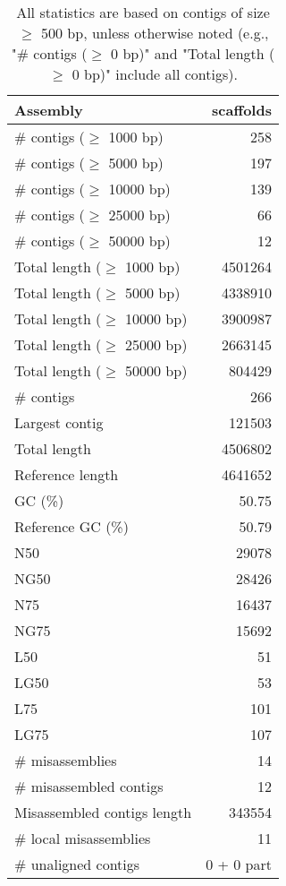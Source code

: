 \documentclass[12pt,a4paper]{article}
\begin{document}
\begin{table}[ht]
\begin{center}
\caption{All statistics are based on contigs of size $\geq$ 500 bp, unless otherwise noted (e.g., "\# contigs ($\geq$ 0 bp)" and "Total length ($\geq$ 0 bp)" include all contigs).}
\begin{tabular}{|l*{1}{|r}|}
\hline
Assembly & scaffolds \\ \hline
\# contigs ($\geq$ 1000 bp) & 258 \\ \hline
\# contigs ($\geq$ 5000 bp) & 197 \\ \hline
\# contigs ($\geq$ 10000 bp) & 139 \\ \hline
\# contigs ($\geq$ 25000 bp) & 66 \\ \hline
\# contigs ($\geq$ 50000 bp) & 12 \\ \hline
Total length ($\geq$ 1000 bp) & 4501264 \\ \hline
Total length ($\geq$ 5000 bp) & 4338910 \\ \hline
Total length ($\geq$ 10000 bp) & 3900987 \\ \hline
Total length ($\geq$ 25000 bp) & 2663145 \\ \hline
Total length ($\geq$ 50000 bp) & 804429 \\ \hline
\# contigs & 266 \\ \hline
Largest contig & 121503 \\ \hline
Total length & 4506802 \\ \hline
Reference length & 4641652 \\ \hline
GC (\%) & 50.75 \\ \hline
Reference GC (\%) & 50.79 \\ \hline
N50 & 29078 \\ \hline
NG50 & 28426 \\ \hline
N75 & 16437 \\ \hline
NG75 & 15692 \\ \hline
L50 & 51 \\ \hline
LG50 & 53 \\ \hline
L75 & 101 \\ \hline
LG75 & 107 \\ \hline
\# misassemblies & 14 \\ \hline
\# misassembled contigs & 12 \\ \hline
Misassembled contigs length & 343554 \\ \hline
\# local misassemblies & 11 \\ \hline
\# unaligned contigs & 0 + 0 part \\ \hline

\end{tabular}
\end{center}
\end{table}
\end{document}
